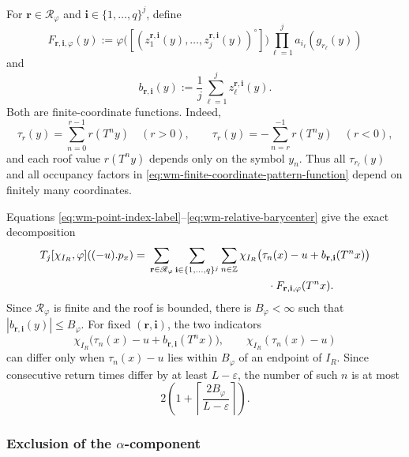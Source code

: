 \documentclass[11pt,reqno,a4paper]{amsart}
\numberwithin{equation}{section}
\theoremstyle{compact}
\theoremstyle{definition}
\theoremstyle{definition}
\begin{document}
For $\mathbf r\in\mathscr R_\varphi$ and
$\mathbf i\in\{1,\ldots,q\}^j$, define
\begin{equation}\label{eq:wm-finite-coordinate-pattern-function}
  F_{\mathbf r,\mathbf i,\varphi}(y)
  :=\varphi\bigl([(z_1^{\mathbf r,\mathbf i}(y),\ldots,
                    z_j^{\mathbf r,\mathbf i}(y))^\circ]\bigr)
    \prod_{\ell=1}^j a_{i_\ell}(g_{r_\ell}(y))
\end{equation}
and
\begin{equation}\label{eq:wm-relative-barycenter}
  b_{\mathbf r,\mathbf i}(y)
  :=\frac1j\sum_{\ell=1}^j z_\ell^{\mathbf r,\mathbf i}(y).
\end{equation}
Both are finite-coordinate functions.  Indeed,
\[
  \tau_r(y)=\sum_{n=0}^{r-1}r(T^ny)\quad(r>0),
  \qquad
  \tau_r(y)=-\sum_{n=r}^{-1}r(T^ny)\quad(r<0),
\]
and each roof value $r(T^ny)$ depends only on the symbol $y_n$.
Thus all $\tau_{r_\ell}(y)$ and all occupancy factors in
\eqref{eq:wm-finite-coordinate-pattern-function} depend on finitely many
coordinates.

Equations \eqref{eq:wm-point-index-label}--\eqref{eq:wm-relative-barycenter}
give the exact decomposition
\begin{equation}\label{eq:wm-exact-pattern-decomposition}
  \begin{aligned}
  T_j[\chi_{I_R},\varphi]((-u).p_x)
  ={}&\sum_{\mathbf r\in\mathscr R_\varphi}
      \sum_{\mathbf i\in\{1,\ldots,q\}^j}
      \sum_{n\in\mathbb Z}
      \chi_{I_R}\bigl(\tau_n(x)-u
          +b_{\mathbf r,\mathbf i}(T^nx)\bigr) \\
     &\hspace{38mm}\cdot
      F_{\mathbf r,\mathbf i,\varphi}(T^nx).
  \end{aligned}
\end{equation}
Since $\mathscr R_\varphi$ is finite and the roof is bounded, there is
$B_\varphi<\infty$ such that
$|b_{\mathbf r,\mathbf i}(y)|\leq B_\varphi$.  For fixed
$(\mathbf r,\mathbf i)$, the two indicators
\[
  \chi_{I_R}\bigl(\tau_n(x)-u+b_{\mathbf r,\mathbf i}(T^nx)\bigr),
  \qquad
  \chi_{I_R}(\tau_n(x)-u)
\]
can differ only when $\tau_n(x)-u$ lies within $B_\varphi$ of an endpoint of
$I_R$.  Since consecutive return times differ by at least
$L-\varepsilon$, the number of such $n$ is at most
\begin{equation}\label{eq:wm-boundary-index-number}
  2\left(1+\left\lceil\frac{2B_\varphi}{L-\varepsilon}\right\rceil\right).
\end{equation}

\subsubsection{Exclusion of the $\alpha$-component}
\end{document}
